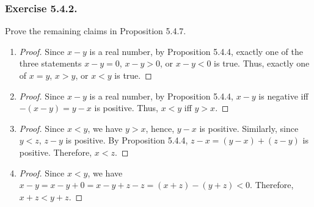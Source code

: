 \documentclass[12pt, letter]{article}
\begin{document}
\subsubsection*{Exercise 5.4.2.}
Prove the remaining claims in Proposition 5.4.7.
\begin{enumerate}[label=(\alph*)]
    \item \begin{proof}
        Since $x-y$ is a real number, by Proposition 5.4.4, exactly one of the three statements $x-y=0$, $x-y>0$, or $x-y<0$ is true. Thus, exactly one of $x=y$, $x>y$, or 
        $x<y$ is true.
    \end{proof}
    \item \begin{proof}
        Since $x-y$ is a real number, by Proposition 5.4.4, $x-y$ is negative iff $-(x-y)=y-x$ is positive. Thus, $x<y$ iff $y>x$.
    \end{proof}
    \item \begin{proof}
        Since $x<y$, we have $y>x$, hence, $y-x$ is positive. Similarly, since $y<z$, $z-y$ is positive. By Proposition 5.4.4, $z-x=(y-x)+(z-y)$ is positive.
        Therefore, $x<z$. 
    \end{proof}
    \item \begin{proof}
        Since $x<y$, we have $x-y=x-y+0=x-y+z-z=(x+z)-(y+z)<0$. Therefore, $x+z<y+z$.
    \end{proof}
\end{enumerate}
\end{document}

